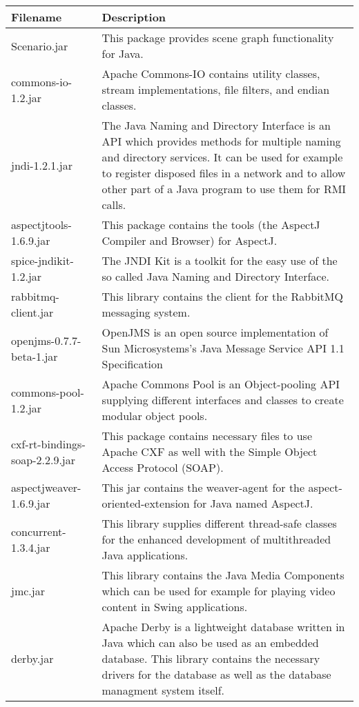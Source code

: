 \begin{center}
\begin{longtable}{|p{}|p{}|}
\hline 
Filename & Description\\
\hline
\hline 
Scenario.jar & This package provides scene graph functionality for Java.\\
\hline 
commons-io-1.2.jar & Apache Commons-IO contains utility classes, stream implementations, file filters, and endian classes.\\
\hline 
jndi-1.2.1.jar & The Java Naming and Directory Interface is an API which provides methods for multiple naming and directory services. It can be used for example to register disposed files in a network and to allow other part of a Java program to use them for RMI calls.\\
\hline 
aspectjtools-1.6.9.jar & This package contains the tools (the AspectJ Compiler and Browser) for AspectJ.\\
\hline 
spice-jndikit-1.2.jar & The JNDI Kit is a toolkit for the easy use of the so called Java Naming and Directory Interface.\\
\hline 
rabbitmq-client.jar & This library contains the client for the RabbitMQ messaging system.\\
\hline 
openjms-0.7.7-beta-1.jar & OpenJMS is an open source implementation of Sun Microsystems's Java Message Service API 1.1 Specification\\
\hline 
commons-pool-1.2.jar & Apache Commons Pool is an Object-pooling API supplying different interfaces and classes to create modular object pools.\\
\hline 
cxf-rt-bindings-soap-2.2.9.jar & This package contains necessary files to use Apache CXF as well with the Simple Object Access Protocol (SOAP).\\
\hline 
aspectjweaver-1.6.9.jar & This jar contains the weaver-agent for the aspect-oriented-extension for Java named AspectJ.\\
\hline 
concurrent-1.3.4.jar & This library supplies different thread-safe classes for the enhanced development of multithreaded Java applications.\\
\hline 
jmc.jar & This library contains the Java Media Components which can be used for example for playing video content in Swing applications.\\
\hline 
derby.jar & Apache Derby is a lightweight database written in Java which can also be used as an embedded database. This library contains the necessary drivers for the database as well as the database managment system itself.\\

\end{longtable}
\end{center}
